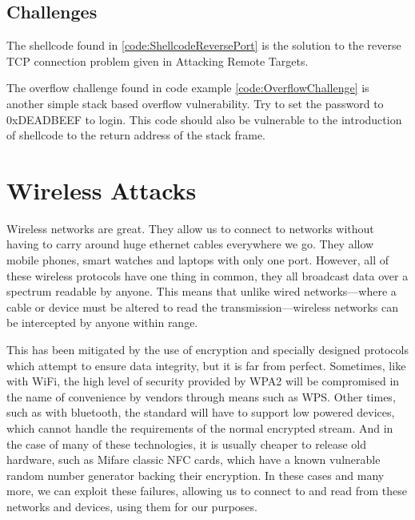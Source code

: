 \documentclass[a4paper,11pt]{report}
\begin{document}
	\section{Challenges}
		The shellcode found in \ref{code:ShellcodeReversePort} is the solution to the reverse TCP connection problem given in Attacking Remote Targets. 
		\begin{code}
			Assembler}]{./ShellcodeReversePort.asm}
			\caption{Reverse socket connection shellcode challenge}
			\label{code:ShellcodeReversePort}
		\end{code}
		\newpage
		The overflow challenge found in code example \ref{code:OverflowChallenge} is another simple stack based overflow vulnerability. 
		Try to set the password to 0xDEADBEEF to login.
		This code should also be vulnerable to the introduction of shellcode to the return address of the stack frame. 
		\begin{code}
			C}]{./OverflowChallenge.c}
			\caption{Overflow Challenge}
			\label{code:OverflowChallenge}
		\end{code}
\chapter{Wireless Attacks}
	\label{ch:WirelessAttacks}
	Wireless networks are great. 
	They allow us to connect to networks without having to carry around huge ethernet cables everywhere we go. 
	They allow mobile phones, smart watches and laptops with only one port. 
	However, all of these wireless protocols have one thing in common, they all broadcast data over a spectrum readable by anyone. 
	This means that unlike wired networks---where a cable or device must be altered to read the transmission---wireless networks can be intercepted by anyone within range. 
	
	This has been mitigated by the use of encryption and specially designed protocols which attempt to ensure data integrity, but it is far from perfect. 
	Sometimes, like with WiFi, the high level of security provided by WPA2 will be compromised in the name of convenience by vendors through means such as WPS.
	Other times, such as with bluetooth, the standard will have to support low powered devices, which cannot handle the requirements of the normal encrypted stream. 
	And in the case of many of these technologies, it is usually cheaper to release old hardware, such as Mifare classic NFC cards, which have a known vulnerable random number generator backing their encryption. 
	In these cases and many more, we can exploit these failures, allowing us to connect to and read from these networks and devices, using them for our purposes. 
\end{document}

